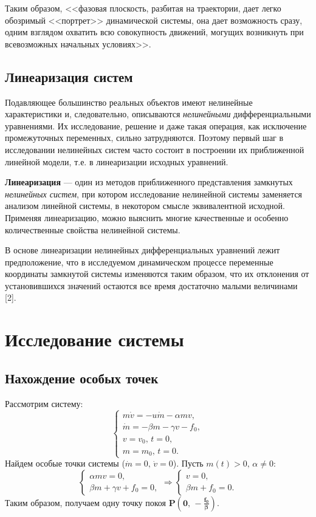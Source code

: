 \documentclass[12pt, a4paper]{article}
\begin{document}
	Таким образом, <<фазовая плоскость, разбитая на траектории, дает легко
	обозримый <<портрет>> динамической системы, она дает возможность сразу,
	одним взглядом охватить всю совокупность движений, могущих возникнуть при
	всевозможных начальных условиях>>. 
	\subsection{Линеаризация систем}
	Подавляющее большинство реальных объектов имеют нелинейные характеристики и, следовательно, описываются \textit{нелинейными} дифференциальными уравнениями. Их исследование, решение и даже такая операция, как исключение промежуточных переменных, сильно затрудняются. Поэтому первый шаг в исследовании нелинейных систем часто состоит в построении их приближенной линейной модели, т.е. в линеаризации исходных уравнений.
	
	\textbf{Линеаризация} --- один из методов приближенного представления замкнутых \textit{нелинейных систем}, при котором исследование нелинейной системы заменяется анализом линейной системы, в некотором смысле эквивалентной исходной. Применяя линеаризацию, можно выяснить многие качественные и особенно количественные свойства нелинейной системы.
	
	В основе линеаризации нелинейных дифференциальных уравнений лежит предположение, что в исследуемом динамическом процессе переменные координаты замкнутой системы изменяются таким образом, что их отклонения от установившихся значений остаются все время достаточно малыми величинами [2].
	\section{Исследование системы}
	\subsection{Нахождение особых точек}
	Рассмотрим систему:
	\begin{equation}
		\begin{cases}
			m\dot v=-u\dot m-\alpha m v, \\
			\dot m=-\beta m-\gamma v-f_0, \\
			v=v_0,\,t=0,\\
			m=m_0,\,t=0.
		\end{cases}
		\label{system1}
	\end{equation}
	Найдем особые точки системы ($\dot m=0,\,\dot v=0$). Пусть $m(t)>0,\,\alpha\ne0$:
	\[	
	\begin{cases}
		\alpha mv=0, \\
		\beta m+\gamma v+f_0=0,
	\end{cases}
	\Longrightarrow
	\begin{cases}
		v=0,\\
		\beta m + f_0=0.
	\end{cases}
	\]
	Таким образом, получаем одну точку покоя $\boldsymbol{P(0,\,-\frac{f_0}{\beta})}.$
\end{document}
